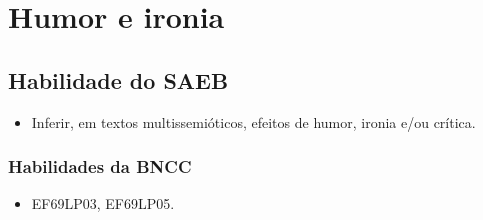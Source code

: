 \chapter{Humor e ironia}

\section*{Habilidade do SAEB}

\begin{itemize}
\item Inferir, em textos multissemióticos, efeitos de humor, ironia e/ou crítica.
\end{itemize}

\subsection{Habilidades da BNCC}

\begin{itemize}
\tightlist
\item
  EF69LP03, EF69LP05.
\end{itemize}

